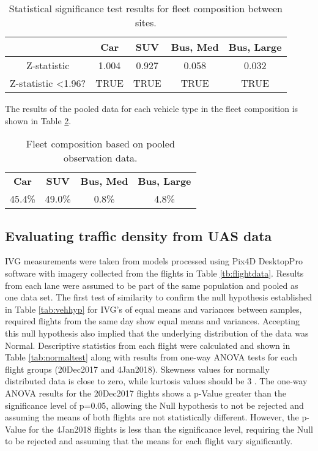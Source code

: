 \begin{table}[!htb]
\centering
\caption{Statistical significance test results for fleet composition between sites.}
\label{tab:fleettest}
\begin{tabular}{@{}ccccc@{}}
\toprule
\textbf{} & \textbf{Car} & \textbf{SUV} & \textbf{Bus, Med} & \textbf{Bus, Large} \\ \midrule
Z-statistic & 1.004 & 0.927 & 0.058 & 0.032 \\
Z-statistic \textless 1.96? & TRUE & TRUE & TRUE & TRUE \\ \bottomrule
\end{tabular}
\end{table}

The results of the pooled data for each vehicle type in the fleet composition is shown in Table \ref{tab:pooledfleet}.

\begin{table}[!htb]
\centering
\caption{Fleet composition based on pooled observation data.}
\label{tab:pooledfleet}
\begin{tabular}{cccc}
\textbf{Car} & \textbf{SUV} & \textbf{Bus, Med} & \textbf{Bus, Large} \\
45.4\% & 49.0\% & 0.8\% & 4.8\%
\end{tabular}
\end{table}

\subsection{Evaluating traffic density from UAS data}

IVG measurements were taken from models processed using Pix4D DesktopPro software with  imagery collected from the flights in Table \ref{tb:flightdata}.  Results from each lane were assumed to be part of the same population and pooled as one data set. The first test of similarity to confirm the null hypothesis established in Table \ref{tab:vehhyp} for IVG's of equal means and variances between samples, required flights from the same day show equal means and variances. Accepting this null hypothesis also implied that the underlying distribution of the data was Normal.  Descriptive statistics from each flight were calculated and shown in Table \ref{tab:normaltest} along with results from one-way ANOVA tests for each flight groups (20Dec2017 and 4Jan2018). Skewness values for normally distributed data is close to zero, while kurtosis values should be 3 \citep{NIST2013}.
The one-way ANOVA results for the 20Dec2017 flights shows a p-Value greater than the significance level of p=0.05, allowing the Null hypothesis to not be rejected and assuming the means of both flights are not statistically different. However, the p-Value for the 4Jan2018 flights is less than the significance level, requiring the Null to be rejected and assuming that the means for each flight vary significantly.

